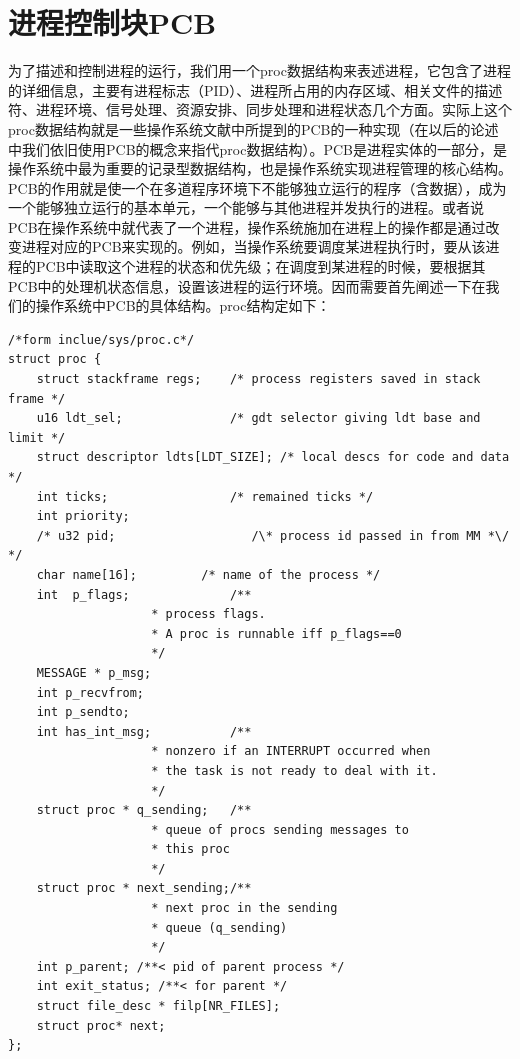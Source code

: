 \documentclass[UTF8,nofonts,cs4size]{ctexrep}
\begin{document}
\section{进程控制块PCB}
为了描述和控制进程的运行，我们用一个proc数据结构来表述进程，它包含了进程的详细信息，主要有进程标志（PID）、进程所占用的内存区域、相关文件的描述符、进程环境、信号处理、资源安排、同步处理和进程状态几个方面。实际上这个proc数据结构就是一些操作系统文献中所提到的PCB的一种实现（在以后的论述中我们依旧使用PCB的概念来指代proc数据结构）。PCB是进程实体的一部分，是操作系统中最为重要的记录型数据结构，也是操作系统实现进程管理的核心结构。PCB的作用就是使一个在多道程序环境下不能够独立运行的程序（含数据），成为一个能够独立运行的基本单元，一个能够与其他进程并发执行的进程。或者说PCB在操作系统中就代表了一个进程，操作系统施加在进程上的操作都是通过改变进程对应的PCB来实现的。例如，当操作系统要调度某进程执行时，要从该进程的PCB中读取这个进程的状态和优先级；在调度到某进程的时候，要根据其PCB中的处理机状态信息，设置该进程的运行环境。因而需要首先阐述一下在我们的操作系统中PCB的具体结构。proc结构定如下：
\begin{lstlisting}
/*form inclue/sys/proc.c*/
struct proc {
	struct stackframe regs;    /* process registers saved in stack frame */
	u16 ldt_sel;               /* gdt selector giving ldt base and limit */
	struct descriptor ldts[LDT_SIZE]; /* local descs for code and data */
    int ticks;                 /* remained ticks */
    int priority;
	/* u32 pid;                   /\* process id passed in from MM *\/ */
	char name[16];		   /* name of the process */
	int  p_flags;              /**
				    * process flags.
				    * A proc is runnable iff p_flags==0
				    */
	MESSAGE * p_msg;
	int p_recvfrom;
	int p_sendto;
	int has_int_msg;           /**
				    * nonzero if an INTERRUPT occurred when
				    * the task is not ready to deal with it.
				    */
	struct proc * q_sending;   /**
				    * queue of procs sending messages to
				    * this proc
				    */
	struct proc * next_sending;/**
				    * next proc in the sending
				    * queue (q_sending)
				    */
	int p_parent; /**< pid of parent process */
	int exit_status; /**< for parent */
	struct file_desc * filp[NR_FILES];
	struct proc* next;
};
\end{lstlisting}
\end{document}
